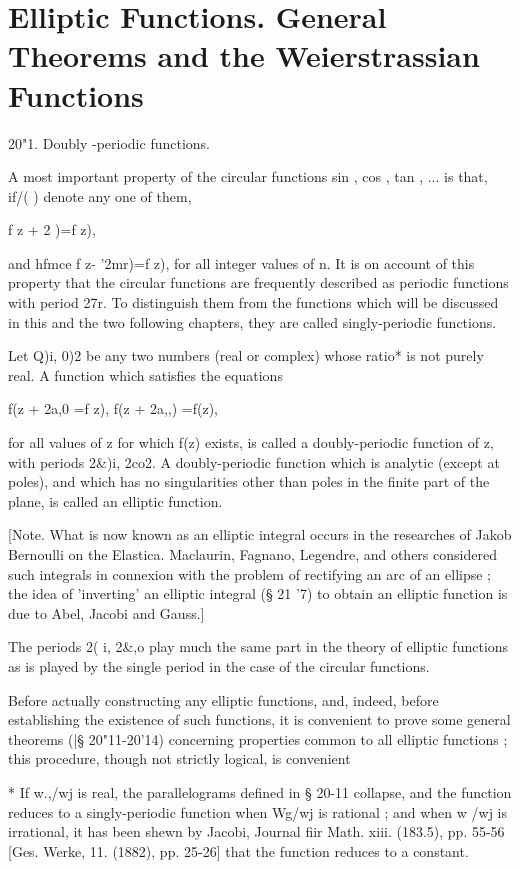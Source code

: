 \chapter{Elliptic Functions. General Theorems and the 
Weierstrassian Functions} 

20"1. Doubly -periodic functions. 

A most important property of the circular functions sin , cos , tan , ... 
is that, if/( ) denote any one of them, 

f z + 2 )=f z), 

and hfmce f z- '2mr)=f z), for all integer values of n. It is on account 
of this property that the circular functions are frequently described as 
periodic functions with period 27r. To distinguish them from the functions 
which will be discussed in this and the two following chapters, they are 
called singly-periodic functions. 

Let Q)i, 0)2 be any two numbers (real or complex) whose ratio* is not purely 
real. A function which satisfies the equations 

f(z + 2a,0 =f z), f(z + 2a,,) =f(z), 

for all values of z for which f(z) exists, is called a doubly-periodic function 
of z, with periods 2\&)i, 2co2. A doubly-periodic function which is analytic 
(except at poles), and which has no singularities other than poles in the 
finite part of the plane, is called an elliptic function. 

[Note. What is now known as an elliptic integral  occurs in the researches of Jakob 
Bernoulli on the Elastica. Maclaurin, Fagnano, Legendre, and others considered such 
integrals in connexion with the problem of rectifying an arc of an ellipse ; the idea of 
'inverting' an elliptic integral (§ 21 '7) to obtain an elliptic function is due to Abel, 
Jacobi and Gauss.] 

The periods 2( i, 2\&,o play much the same part in the theory of elliptic 
functions as is played by the single period in the case of the circular 
functions. 

Before actually constructing any elliptic functions, and, indeed, before 
establishing the existence of such functions, it is convenient to prove some 
general theorems (|§ 20"11-20'14) concerning properties common to all 
elliptic functions ; this procedure, though not strictly logical, is convenient 

* If w.,/wj is real, the parallelograms defined in § 20-11 collapse, and the function reduces to 
a singly-periodic function when Wg/wj is rational ; and when w /wj is irrational, it has been shewn 
by Jacobi, Journal fiir Math. xiii. (183.5), pp. 55-56 [Ges. Werke, 11. (1882), pp. 25-26] that the 
function reduces to a constant. 

